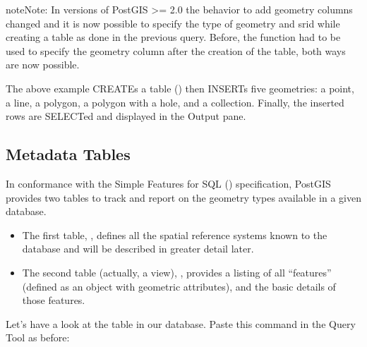 \documentclass[a4paper,11pt,english]{sphinxmanual}
\begin{document}
\noindent{}

\begin{sphinxadmonition}{note}{Note:}
In versions of PostGIS \textgreater{}= 2.0 the behavior to add geometry columns changed and it is now possible to specify the type of geometry and srid while creating a table as done in the previous query. Before, the  function had to be used to specify the geometry column after the creation of the table, both ways are now possible.
\end{sphinxadmonition}

The above example CREATEs a table () then INSERTs five geometries: a point, a line, a polygon, a polygon with a hole, and a collection. Finally, the inserted rows are SELECTed and displayed in the Output pane.


\subsection{Metadata Tables}
\label{\detokenize{basic:metadata-tables}}
In conformance with the Simple Features for SQL ({\hyperref[\detokenize{glossary:term-sfsql}]{}}) specification, PostGIS provides two tables to track and report on the geometry types available in a given database.
\begin{itemize}
\item {} 
The first table, , defines all the spatial reference systems known to the database and will be described in greater detail later.

\item {} 
The second table (actually, a view), , provides a listing of all “features” (defined as an object with geometric attributes), and the basic details of those features.

\end{itemize}

\noindent{}

Let’s have a look at the  table in our database.  Paste this command in the Query Tool as before:

\begin{sphinxVerbatim}[commandchars=\\\{\}]
   
\end{sphinxVerbatim}
\end{document}
